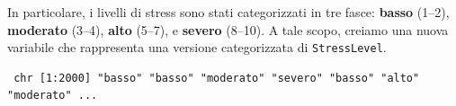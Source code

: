 \documentclass[
  ignorenonframetext,
  compress, aspectratio=149]{beamer}
\newenvironment{Shaded}{\begin{snugshade}}{\end{snugshade}}
\newcommand{\CommentTok}[1]{\textcolor[rgb]{0.56,0.35,0.01}{\textit{#1}}}
\newcommand{\DecValTok}[1]{\textcolor[rgb]{0.00,0.00,0.81}{#1}}
\newcommand{\FunctionTok}[1]{\textcolor[rgb]{0.13,0.29,0.53}{\textbf{#1}}}
\newcommand{\NormalTok}[1]{#1}
\newcommand{\OtherTok}[1]{\textcolor[rgb]{0.56,0.35,0.01}{#1}}
\newcommand{\SpecialCharTok}[1]{\textcolor[rgb]{0.81,0.36,0.00}{\textbf{#1}}}
\newcommand{\StringTok}[1]{\textcolor[rgb]{0.31,0.60,0.02}{#1}}
\begin{document}
\begin{frame}[fragile]
In particolare, i livelli di stress sono stati categorizzati in tre
fasce: \textbf{basso} (1--2), \textbf{moderato} (3--4), \textbf{alto}
(5--7), e \textbf{severo} (8--10). A tale scopo, creiamo una nuova
variabile che rappresenta una versione categorizzata di
\texttt{StressLevel}.

\begin{Shaded}
\end{Shaded}

\begin{verbatim}
 chr [1:2000] "basso" "basso" "moderato" "severo" "basso" "alto" "moderato" ...
\end{verbatim}
\end{frame}
\end{document}
